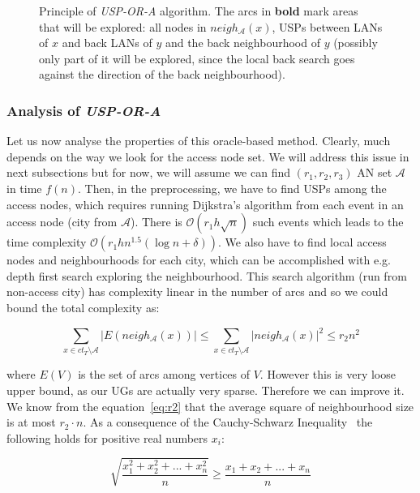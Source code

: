 	\begin{figure}[h!]
		\begin{center}
		\end{center}
		\caption{\label{fig:uspora} Principle of \textit{USP-OR-A} algorithm. The arcs in \textbf{bold} mark areas that will be explored: all nodes in $neigh_{\mathcal{A}}(x)$, USPs between LANs of $x$ and back LANs of $y$ and the back neighbourhood of $y$ (possibly only part of it will be explored, since the local back search goes against the direction of the back neighbourhood).}
	\end{figure}
	
	\subsubsection{Analysis of \textit{USP-OR-A}}
	
		\noindent Let us now analyse the properties of this oracle-based method. Clearly, much depends on the way we look for the access node set. We will address this issue in next subsections but for now, we will assume we can find $(r_{1}, r_{2}, r_{3})$ AN set $\mathcal{A}$ in time $f(n)$. Then, in the preprocessing, we have to find USPs among the access nodes, which requires running Dijkstra's algorithm from each event in an access node (city from $\mathcal{A}$). There is $\mathcal{O}(r_{1}h\sqrt{n})$ such events which leads to the time complexity $\mathcal{O}(r_{1}hn^{1.5} (\log n + \delta))$. We also have to find local access nodes and neighbourhoods for each city, which can be accomplished with e.g. depth first search exploring the neighbourhood. This search algorithm (run from non-access city) has complexity linear in the number of arcs and so we could bound the total complexity as:
		
		$$
		\sum_{x \in ct_{T} \setminus \mathcal{A}} |E(neigh_{\mathcal{A}}(x))| 
		\leq \sum_{x \in ct_{T} \setminus \mathcal{A}} |neigh_{\mathcal{A}}(x)|^{2} 
		\leq r_{2} n^{2}
		$$
		
		\noindent where $E(V)$ is the set of arcs among vertices of $V$. However this is very loose upper bound, as our UGs are actually very sparse. Therefore we can improve it. We know from the equation~\ref{eq:r2} that the average square of neighbourhood size is at most $r_{2} \cdot n$. As a consequence of the Cauchy-Schwarz Inequality~\cite{cauchy} the following holds for positive real numbers $x_{i}$:
		
		$$ 
		\sqrt{\frac{x_{1}^{2} + x_{2}^{2} + ... + x_{n}^{2}}{n}} 
		\geq \frac{x_{1} + x_{2} + ... + x_{n}}{n} $$
		
